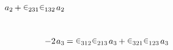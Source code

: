 \begin{alignat*}{2}
a_{2} \hspace{-0.1ex} \tikzmark{permutationsparity312with2ENDS}
+ \hspace{.4ex} \tikzmark{permutationsparity231for2FROM} \hspace{-0.4ex} \permutationsparitysymbols{231} \hspace{-0.3ex} \tikzmark{permutationsparity231for2TO} \hspace{.3ex}
\hspace{.4ex} \tikzmark{permutationsparity132for2FROM} \hspace{-0.4ex} \permutationsparitysymbols{132} \hspace{-0.3ex} \tikzmark{permutationsparity132for2TO} \hspace{.5ex}
a_{2} \hspace{-0.1ex} \tikzmark{permutationsparity132with2ENDS}
\\[2.5em]
-2 \hspace{.2ex} a_{3} \hspace{-0.1ex}
& = \hspace{.4ex} \tikzmark{permutationsparity312for3FROM} \hspace{-0.4ex} \permutationsparitysymbols{312} \hspace{-0.3ex} \tikzmark{permutationsparity312for3TO} \hspace{.3ex}
\hspace{.4ex} \tikzmark{permutationsparity213for3FROM} \hspace{-0.4ex} \permutationsparitysymbols{213} \hspace{-0.3ex} \tikzmark{permutationsparity213for3TO} \hspace{.5ex}
a_{3} \hspace{-0.1ex} \tikzmark{permutationsparity213with3ENDS}
+ \hspace{.4ex} \tikzmark{permutationsparity321for3FROM} \hspace{-0.4ex} \permutationsparitysymbols{321} \hspace{-0.3ex} \tikzmark{permutationsparity321for3TO} \hspace{.3ex}
\hspace{.4ex} \tikzmark{permutationsparity123for3FROM} \hspace{-0.4ex} \permutationsparitysymbols{123} \hspace{-0.3ex} \tikzmark{permutationsparity123for3TO} \hspace{.5ex}
a_{3} \hspace{-0.1ex} \tikzmark{permutationsparity123with3ENDS}
\end{alignat*}%

